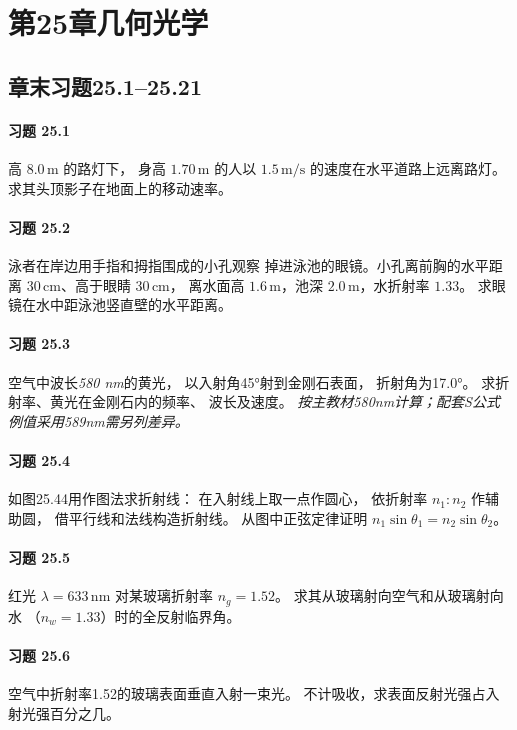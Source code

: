 \section*{第25章\quad 几何光学}
\subsection*{章末习题25.1--25.21}
\paragraph{习题 25.1}
高 \(8.0\,\mathrm m\) 的路灯下，
身高 \(1.70\,\mathrm m\) 的人以
\(1.5\,\mathrm{m/s}\) 的速度在水平道路上远离路灯。
求其头顶影子在地面上的移动速率。
\paragraph{习题 25.2}
泳者在岸边用手指和拇指围成的小孔观察
掉进泳池的眼镜。小孔离前胸的水平距离
\(30\,\mathrm{cm}\)、高于眼睛 \(30\,\mathrm{cm}\)，
离水面高 \(1.6\,\mathrm m\)，池深
\(2.0\,\mathrm m\)，水折射率 \(1.33\)。
求眼镜在水中距泳池竖直壁的水平距离。
\paragraph{习题 25.3}
空气中波长\emph{580 nm}的黄光，
以入射角45°射到金刚石表面，
折射角为17.0°。
求折射率、黄光在金刚石内的频率、
波长及速度。
\textit{按主教材580nm计算；配套S公式例值采用589nm需另列差异。}
\paragraph{习题 25.4}
如图25.44用作图法求折射线：
在入射线上取一点作圆心，
依折射率 \(n_1:n_2\) 作辅助圆，
借平行线和法线构造折射线。
从图中正弦定律证明
\(n_1\sin\theta_1=n_2\sin\theta_2\)。
\paragraph{习题 25.5}
红光 \(\lambda=633\,\mathrm{nm}\) 对某玻璃折射率
\(n_g=1.52\)。
求其从玻璃射向空气和从玻璃射向水
（\(n_w=1.33\)）时的全反射临界角。
\paragraph{习题 25.6}
空气中折射率1.52的玻璃表面垂直入射一束光。
不计吸收，求表面反射光强占入射光强百分之几。

